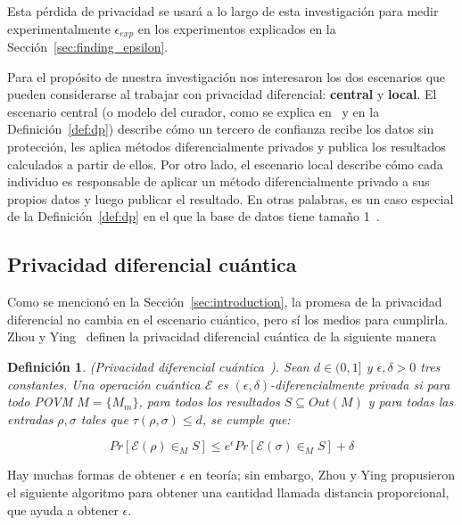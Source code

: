 \documentclass{ieeeaccess}
\newtheorem{definition}{Definición}[section]
\begin{document}
Esta pérdida de privacidad se usará a lo largo de esta investigación para medir experimentalmente $\epsilon_{exp}$ en los experimentos explicados en la Sección~\ref{sec:finding_epsilon}.

Para el propósito de nuestra investigación nos interesaron los dos escenarios que pueden considerarse al trabajar con privacidad diferencial: \textbf{central} y \textbf{local}. El escenario central (o modelo del curador, como se explica en~\cite{dwork2014algorithmic} y en la Definición~\ref{def:dp}) describe cómo un tercero de confianza recibe los datos sin protección, les aplica métodos diferencialmente privados y publica los resultados calculados a partir de ellos. Por otro lado, el escenario local describe cómo cada individuo es responsable de aplicar un método diferencialmente privado a sus propios datos y luego publicar el resultado. En otras palabras, es un caso especial de la Definición~\ref{def:dp} en el que la base de datos tiene tamaño 1~\cite[Def.~12.1]{dwork2014algorithmic}.


\subsection{Privacidad diferencial cuántica}

Como se mencionó en la Sección~\ref{sec:introduction}, la promesa de la privacidad diferencial no cambia en el escenario cuántico, pero sí los medios para cumplirla. Zhou y Ying~\cite{zhou2017differential} definen la privacidad diferencial cuántica de la siguiente manera

\begin{definition}
    (Privacidad diferencial cuántica~\cite{zhou2017differential}). Sean $d \in (0,1]$ y $\epsilon,\delta > 0$ tres constantes. Una operación cuántica $\mathcal{E}$ es $(\epsilon, \delta)$-diferencialmente privada si para todo POVM $M = \{M_m\}$, para todos los resultados $S \subseteq Out(M)$ y para todas las entradas $\rho, \sigma$ tales que $\tau(\rho, \sigma)\leq d$, se cumple que:

    \[
      Pr[\mathcal{E}(\rho)\in_{M}S] \leq e^{\epsilon} Pr[\mathcal{E}(\sigma)\in_{M}S] + \delta
    \]
    \label{def:qdp}
\end{definition}

Hay muchas formas de obtener $\epsilon$ en teoría; sin embargo, Zhou y Ying propusieron el siguiente algoritmo para obtener una cantidad llamada distancia proporcional, que ayuda a obtener $\epsilon$.
\end{document}
